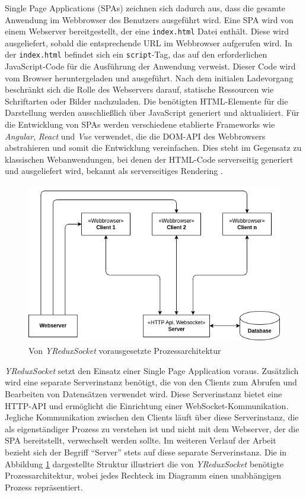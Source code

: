 \documentclass[12pt]{book}          %
\begin{document}
Single Page Applications (SPAs) zeichnen sich dadurch aus, dass die gesamte Anwendung im Webbrowser des Benutzers ausgeführt wird. Eine SPA wird von einem Webserver bereitgestellt, der eine \texttt{index.html} Datei enthält. Diese wird ausgeliefert, sobald die entsprechende URL im Webbrowser aufgerufen wird. In der \texttt{index.html} befindet sich ein \texttt{script}-Tag, das auf den erforderlichen JavaScript-Code für die Ausführung der Anwendung verweist. Dieser Code wird vom Browser heruntergeladen und ausgeführt. Nach dem initialen Ladevorgang beschränkt sich die Rolle des Webservers darauf, statische Ressourcen wie Schriftarten oder Bilder nachzuladen. Die benötigten HTML-Elemente für die Darstellung werden ausschließlich über JavaScript generiert und aktualisiert. Für die Entwicklung von SPAs werden verschiedene etablierte Frameworks wie \textit{Angular}, \textit{React} und \textit{Vue} verwendet, die die DOM-API des Webbrowsers abstrahieren und somit die Entwicklung vereinfachen. Dies steht im Gegensatz zu klassischen Webanwendungen, bei denen der HTML-Code serverseitig generiert und ausgeliefert wird, bekannt als serverseitiges Rendering \cite[1]{hartmann_react_2020}.

\begin{figure}[htbp]
\centering
\includegraphics[height=7cm]{abbildungen/spa-architecture.png}
\caption{Von \textit{YReduxSocket} vorausgesetzte Prozessarchitektur}
\label{spa-architecture}
\end{figure}

\textit{YReduxSocket} setzt den Einsatz einer Single Page Application voraus. Zusätzlich wird eine separate Serverinstanz benötigt, die von den Clients zum Abrufen und Bearbeiten von Datensätzen verwendet wird. Diese Serverinstanz bietet eine HTTP-API und ermöglicht die Einrichtung einer WebSocket-Kommunikation. Jegliche Kommunikation zwischen den Clients läuft über diese Serverinstanz, die als eigenständiger Prozess zu verstehen ist und nicht mit dem Webserver, der die SPA bereitstellt, verwechselt werden sollte. Im weiteren Verlauf der Arbeit bezieht sich der Begriff "`Server"' stets auf diese separate Serverinstanz. Die in Abbildung \ref{spa-architecture} dargestellte Struktur illustriert die von \textit{YReduxSocket} benötigte Prozessarchitektur, wobei jedes Rechteck im Diagramm einen unabhängigen Prozess repräsentiert.
\end{document}

